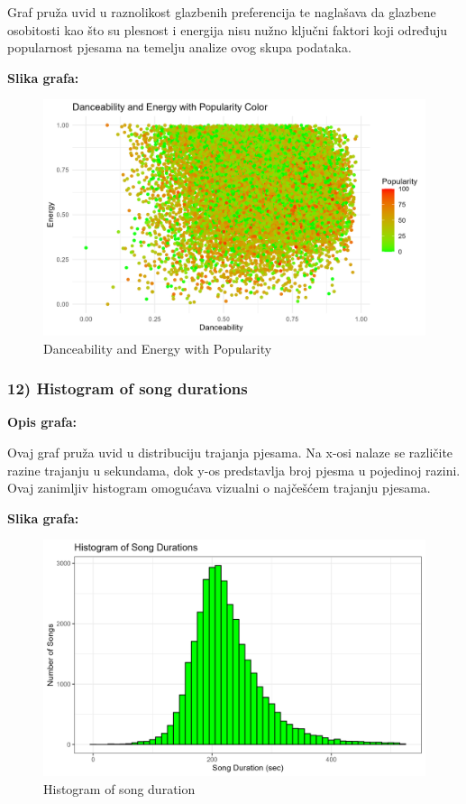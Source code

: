 	Graf pruža uvid u raznolikost glazbenih preferencija te naglašava da glazbene osobitosti kao što su plesnost i energija nisu nužno ključni faktori koji određuju popularnost pjesama na temelju analize ovog skupa podataka.
	
	\textbf{Slika grafa:}
	\begin{figure}[H]
		\includegraphics[scale=0.9]{slike/Dance-Energy-popularity.png}
		\centering
		\caption{ Danceability and Energy with Popularity}
		
	\end{figure}


	\subsubsection{12) Histogram of song durations}
    
    \textbf{Opis grafa:}
    
Ovaj graf pruža uvid u distribuciju trajanja pjesama. Na x-osi nalaze se različite razine trajanju u sekundama, dok y-os predstavlja broj pjesma u pojedinoj razini. Ovaj zanimljiv histogram omogućava vizualni o najčešćem trajanju pjesama.
    

    \textbf{Slika grafa:}
    \begin{figure}[H]
        \includegraphics[scale=0.9]{slike/Histogram of song durations.png}
        \centering
        \caption{Histogram of song duration}
        
    \end{figure}
    
